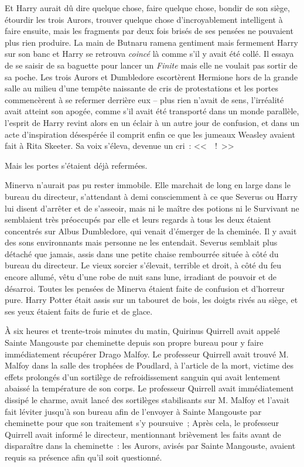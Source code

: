 Et Harry aurait dû dire quelque chose, faire quelque chose, bondir de son siège, étourdir les trois Aurors, trouver quelque chose d'incroyablement intelligent à faire ensuite, mais les fragments par deux fois brisés de ses pensées ne pouvaient plus rien produire. La main de Butnaru ramena gentiment mais fermement Harry sur son banc et Harry se retrouva \emph{coincé} là comme s'il y avait été collé. Il essaya de se saisir de sa baguette pour lancer un \emph{Finite} mais elle ne voulait pas sortir de sa poche. Les trois Aurors et Dumbledore escortèrent Hermione hors de la grande salle au milieu d'une tempête naissante de cris de protestations et les portes commencèrent à se refermer derrière eux -- plus rien n'avait de sens, l'irréalité avait atteint son apogée, comme s'il avait été transporté dans un monde parallèle, l'esprit de Harry revint alors en un éclair à un autre jour de confusion, et dans un acte d'inspiration désespérée il comprit enfin ce que les jumeaux Weasley avaient fait à Rita Skeeter. Sa voix s'éleva, devenue un cri~: <<~~!~>>

Mais les portes s'étaient déjà refermées.

\later

Minerva n'aurait pas pu rester immobile. Elle marchait de long en large dans le bureau du directeur, s'attendant à demi consciemment à ce que Severus ou Harry lui disent d'arrêter et de s'asseoir, mais ni le maître des potions ni le Survivant ne semblaient très préoccupés par elle et leurs regards à tous les deux étaient concentrés sur Albus Dumbledore, qui venait d'émerger de la cheminée. Il y avait des sons environnants mais personne ne les entendait. Severus semblait plus détaché que jamais, assis dans une petite chaise rembourrée située à côté du bureau du directeur. Le vieux sorcier s'élevait, terrible et droit, à côté du feu encore allumé, vêtu d'une robe de nuit sans lune, irradiant de pouvoir et de désarroi. Toutes les pensées de Minerva étaient faite de confusion et d'horreur pure. Harry Potter était assis sur un tabouret de bois, les doigts rivés au siège, et ses yeux étaient faits de furie et de glace.

À six heures et trente-trois minutes du matin, Quirinus Quirrell avait appelé Sainte Mangouste par cheminette depuis son propre bureau pour y faire immédiatement récupérer Drago Malfoy. Le professeur Quirrell avait trouvé M. Malfoy dans la salle des trophées de Poudlard, à l'article de la mort, victime des effets prolongés d'un sortilège de refroidissement sanguin qui avait lentement abaissé la température de son corps. Le professeur Quirrell avait immédiatement dissipé le charme, avait lancé des sortilèges stabilisants sur M. Malfoy et l'avait fait léviter jusqu'à son bureau afin de l'envoyer à Sainte Mangouste par cheminette pour que son traitement s'y poursuive~; Après cela, le professeur Quirrell avait informé le directeur, mentionnant brièvement les faits avant de disparaître dans la cheminette~: les Aurors, avisés par Sainte Mangouste, avaient requis sa présence afin qu'il soit questionné.


